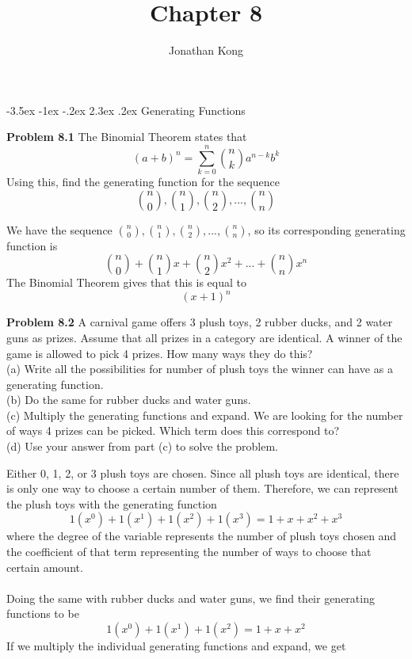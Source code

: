 \documentclass[11pt]{scrartcl}
\title{\normalfont\notesize\textbf{Chapter 8}}
\author{Jonathan Kong}
\date{}
\makeatletter
\renewcommand\section{\@startsection{section}{1}{\z@}%
                                   {-3.5ex \@plus -1ex \@minus -.2ex}%
                                   {2.3ex \@plus.2ex}%
                                   {\normalfont\large\bfseries}}
\makeatother
\begin{document}
\maketitle
\section{Generating Functions}
\noindent 
\begin{tcolorbox}
\textbf{Problem 8.1} The Binomial Theorem states that 
$$(a+b)^n=\sum_{k=0}^n{n \choose k}a^{n-k}b^k$$
\noindent
Using this, find the generating function for the sequence $${{n \choose 0}, {n \choose 1}, {n \choose 2},...,{n \choose n}}$$
\end{tcolorbox}
\noindent 
We have the sequence ${n \choose 0}, {n \choose 1}, {n \choose 2},...,{n \choose n}$, so its corresponding generating function is  
$${n \choose 0} + {n \choose 1}x + {n \choose 2}x^2 +...+ {n \choose n}x^n$$
\noindent 
The Binomial Theorem gives that this is equal to 
$$(x+1)^n$$
\begin{tcolorbox}
\textbf{Problem 8.2} A carnival game offers 3 plush toys, 2 rubber ducks, and 2 water guns as prizes. Assume that all prizes in a category are identical. A winner of the game is allowed to pick 4 prizes. How many ways they do this?\\
(a) Write all the possibilities for number of plush toys the winner can have as a generating function. \\
(b) Do the same for rubber ducks and water guns. \\
(c) Multiply the generating functions and expand. We are looking for the number of ways 4 prizes can be picked. Which term does this correspond to? \\
(d) Use your answer from part (c) to solve the problem. 
\end{tcolorbox}
\noindent 
Either 0, 1, 2, or 3 plush toys are chosen. Since all plush toys are identical, there is only one way to choose a certain number of them. Therefore, we can represent the plush toys with the generating function 
$$1(x^0)+1(x^1)+1(x^2)+1(x^3)=1+x+x^2+x^3$$
where the degree of the variable represents the number of plush toys chosen and the coefficient of that term representing the number of ways to choose that certain amount. \\
\\
\noindent 
Doing the same with rubber ducks and water guns, we find their generating functions to be 
$$1(x^0)+1(x^1)+1(x^2)=1+x+x^2$$
If we multiply the individual generating functions and expand, we get 
\end{document}
